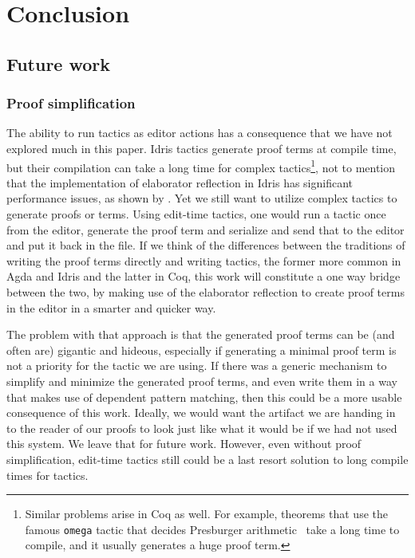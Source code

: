 \section{Conclusion}\label{sec:conclusion}

\subsection{Future work}

\subsubsection{Proof simplification}

The ability to run tactics as editor actions has a consequence
that we have not explored much in this paper.
Idris tactics generate proof terms at compile time, but their
compilation can take a long time for complex tactics\footnote{Similar problems
arise in Coq as well. For example, theorems that use the famous \texttt{omega}
tactic that decides Presburger arithmetic~\cite{omega} take a long time to compile, and it
usually generates a huge proof term.},
not to mention that the implementation of elaborator
reflection in Idris has significant performance issues, as shown by \citet{leanmeta}.
Yet we still want to utilize complex tactics to generate proofs or terms.
Using edit-time tactics, one would run a tactic once from the editor, generate
the proof term and serialize and send that to the editor and put it back in the
file.
If we think of the differences between the traditions of writing the proof
terms directly and writing tactics, the former more common in Agda and Idris
and the latter in Coq, this work will constitute a one way bridge
between the two, by making use of the elaborator reflection to create proof
terms in the editor in a smarter and quicker way.

The problem with that approach is that the generated proof terms can be (and
often are) gigantic and hideous, especially if generating a minimal proof term
is not a priority for the tactic we are using.
If there was a generic mechanism to simplify and minimize the generated proof
terms, and even write them in a way that makes use of dependent pattern
matching, then this could be a more usable consequence of this work.
Ideally, we would want the artifact we are handing in to the reader of our
proofs to look just like what it would be if we had not used this system.
We leave that for future work.  However, even without proof simplification,
edit-time tactics still could be a last resort solution to long compile times
for tactics.

